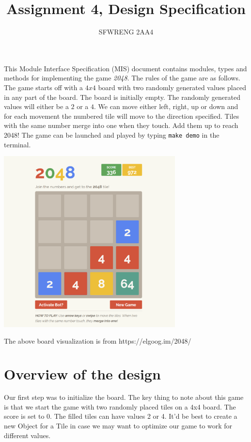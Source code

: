 \documentclass[12pt]{article}
\title{Assignment 4, Design Specification}
\author{SFWRENG 2AA4}
\begin{document}
\maketitle
This Module Interface Specification (MIS) document contains modules, types and
methods for implementing the game \textit{2048}. The rules of the game are as follows. 
The game starts off with a $4x4$ board with two randomly generated values placed in any part of the board. The board is initially empty. The randomly generated values will either be a $2$ or a $4$. We can move either left, right, up or down and for each movement the numbered tile will move to the direction specified. Tiles with the same number merge into one when they touch. Add them up to reach 2048! The game can be launched and played by typing \texttt{make demo} in the terminal.


\begin{center}
  \includegraphics[width=0.7\textwidth]{2048-game.png}

  The above board visualization is from https://elgoog.im/2048/
\end{center}

\newpage

\section{Overview of the design}

Our first step was to initialize the board. The key thing to note about this game is
that we start the game with two randomly placed tiles on a 4x4 board. The score is set to 0.
The filled tiles can have values 2 or 4. It'd be best to create a new Object for a Tile in case we may want to optimize our game to work for different values.
\end{document}
